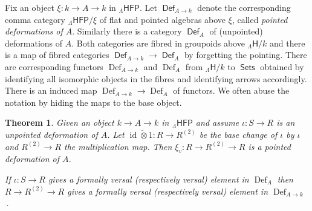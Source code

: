 \documentclass[a4paper,10pt]{amsart}
\theoremstyle{plain}
\newtheorem{thm}[xx]{Theorem}%
\theoremstyle{definition}
\theoremstyle{remark}
\numberwithin{equation}{xx}
\DeclareMathOperator{\Def}{Def}
\DeclareMathOperator{\cDef}{\mathsf{Def}}
\DeclareMathOperator{\id}{id}
\DeclareMathOperator{\Sets}{\cat{Sets}}
\newcommand{\co}{\colon}
\newcommand{\ra}{\rightarrow}
\newcommand{\vL}{\varLambda}
\newcommand{\hot}{{\tilde{\otimes}}}
\newcommand{\cat}[1]{\mathsf{{#1}}}
\newcommand{\df}[2]{{\Def}_{#2}^{#1}}
\newcommand{\cdf}[2]{{\cDef}_{#2}^{#1}}
\begin{document}
Fix an object \(\xi\co k\ra A\ra k\) in \({}_{\vL}\cat{HFP}\). Let \(\cdf{}{A\ra k}\) denote the corresponding comma category \({}_{\vL}\cat{HFP}/\xi\) of flat and pointed algebras above \(\xi\), called \emph{pointed deformations of \(A\)}. Similarly there is a category \(\cdf{}{A}\) of (unpointed) deformations of \(A\). Both categories are fibred in groupoids above \({}_{\vL}\cat{H}/k\) and there is a map of fibred categories \(\cdf{}{A\ra k}\ra\cdf{}{A}\) by forgetting the pointing. There are corresponding functors \(\df{}{A\ra k}\) and \(\df{}{A}\) from \({}_{\vL}\cat{H}/k\) to \(\Sets\) obtained by identifying all isomorphic objects in the fibres and identifying arrows accordingly. There is an induced map \(\df{}{A\ra k}\ra\df{}{A}\) of functors. We often abuse the notation by hiding the maps to the base object.
\begin{thm}\label{thm.main}
Given an object \(k\ra A\ra k\) in \({}_{\vL}\cat{HFP}\) and assume \(\iota\co S\ra R\) is an unpointed deformation of \(A\)\textup{.} Let \(\id\hot 1\co R\ra R^{(2)}\) be the base change of \(\iota\) by \(\iota\) and \(R^{(2)}\ra R\) the multiplication map\textup{.} Then \(\xi_{v}\co R\ra R^{(2)}\ra R\) is a pointed deformation of \(A\)\textup{.}

If \(\iota\co S\ra R\) gives a formally versal \textup{(}respectively versal\textup{)} element in \(\df{}{A}\) then \(R\ra R^{(2)}\ra R\) gives a formally versal \textup{(}respectively versal\textup{)} element in \(\df{}{A\ra k}\)\,\textup{.}
\end{thm}
\end{document}
